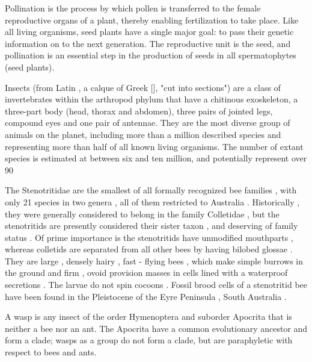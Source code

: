 \documentclass{article} \usepackage{iclr2019_conference,times}
\begin{document}
Pollination is the process by which pollen is transferred to the female reproductive organs of a plant, thereby enabling fertilization to take place. Like all living organisms, seed plants have a single major goal: to pass their genetic information on to the next generation. The reproductive unit is the seed, and pollination is an essential step in the production of seeds in all spermatophytes (seed plants).

Insects (from Latin , a calque of Greek [], "cut into sections") are a class of invertebrates within the arthropod phylum that have a chitinous exoskeleton, a three-part body (head, thorax and abdomen), three pairs of jointed legs, compound eyes and one pair of antennae. They are the most diverse group of animals on the planet, including more than a million described species and representing more than half of all known living organisms. The number of extant species is estimated at between six and ten million, and potentially represent over 90

The Stenotritidae are the smallest of all formally recognized bee families , with only 21 species in two genera , all of them restricted to Australia . Historically , they were generally considered to belong in the family Colletidae , but the stenotritids are presently considered their sister taxon , and deserving of family status . Of prime importance is the stenotritids have unmodified mouthparts , whereas colletids are separated from all other bees by having bilobed glossae . They are large , densely hairy , fast - flying bees , which make simple burrows in the ground and firm , ovoid provision masses in cells lined with a waterproof secretions . The larvae do not spin cocoons . Fossil brood cells of a stenotritid bee have been found in the Pleistocene of the Eyre Peninsula , South Australia .

A wasp is any insect of the order Hymenoptera and suborder Apocrita that is neither a bee nor an ant. The Apocrita have a common evolutionary ancestor and form a clade; wasps as a group do not form a clade, but are paraphyletic with respect to bees and ants.\clearpage{}
\end{document}
